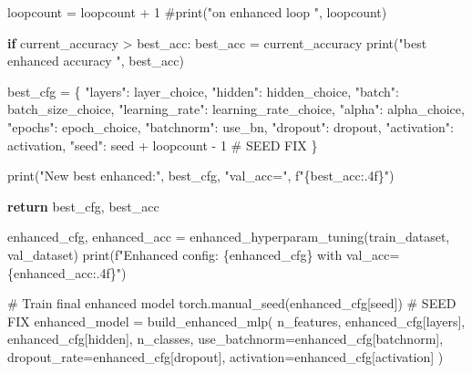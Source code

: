 \documentclass[
  letterpaper,
  DIV=11,
  numbers=noendperiod]{scrartcl}
\newenvironment{Shaded}{\begin{snugshade}}{\end{snugshade}}
\newcommand{\BuiltInTok}[1]{\textcolor[rgb]{0.00,0.23,0.31}{#1}}
\newcommand{\CommentTok}[1]{\textcolor[rgb]{0.37,0.37,0.37}{#1}}
\newcommand{\ControlFlowTok}[1]{\textcolor[rgb]{0.00,0.23,0.31}{\textbf{#1}}}
\newcommand{\DecValTok}[1]{\textcolor[rgb]{0.68,0.00,0.00}{#1}}
\newcommand{\NormalTok}[1]{\textcolor[rgb]{0.00,0.23,0.31}{#1}}
\newcommand{\OperatorTok}[1]{\textcolor[rgb]{0.37,0.37,0.37}{#1}}
\newcommand{\SpecialCharTok}[1]{\textcolor[rgb]{0.37,0.37,0.37}{#1}}
\newcommand{\SpecialStringTok}[1]{\textcolor[rgb]{0.13,0.47,0.30}{#1}}
\newcommand{\StringTok}[1]{\textcolor[rgb]{0.13,0.47,0.30}{#1}}
\begin{document}
\begin{Shaded}
\begin{Highlighting}[]
\NormalTok{        loopcount }\OperatorTok{=}\NormalTok{ loopcount }\OperatorTok{+} \DecValTok{1}
        \CommentTok{\#print("on enhanced loop ", loopcount)}

        \ControlFlowTok{if}\NormalTok{ current\_accuracy }\OperatorTok{\textgreater{}}\NormalTok{ best\_acc:}
\NormalTok{            best\_acc }\OperatorTok{=}\NormalTok{ current\_accuracy}
            \BuiltInTok{print}\NormalTok{(}\StringTok{"best enhanced accuracy "}\NormalTok{, best\_acc)}

\NormalTok{            best\_cfg }\OperatorTok{=}\NormalTok{ \{}
                \StringTok{"layers"}\NormalTok{: layer\_choice,}
                \StringTok{"hidden"}\NormalTok{: hidden\_choice,}
                \StringTok{"batch"}\NormalTok{: batch\_size\_choice,}
                \StringTok{"learning\_rate"}\NormalTok{: learning\_rate\_choice,}
                \StringTok{"alpha"}\NormalTok{: alpha\_choice,}
                \StringTok{"epochs"}\NormalTok{: epoch\_choice,}
                \StringTok{"batchnorm"}\NormalTok{: use\_bn,}
                \StringTok{"dropout"}\NormalTok{: dropout,}
                \StringTok{"activation"}\NormalTok{: activation,}
                \StringTok{"seed"}\NormalTok{: seed }\OperatorTok{+}\NormalTok{ loopcount }\OperatorTok{{-}} \DecValTok{1}  \CommentTok{\# SEED FIX}
\NormalTok{            \}}

            \BuiltInTok{print}\NormalTok{(}\StringTok{"New best enhanced:"}\NormalTok{, best\_cfg, }\StringTok{"val\_acc="}\NormalTok{, }\SpecialStringTok{f"}\SpecialCharTok{\{}\NormalTok{best\_acc}\SpecialCharTok{:.4f\}}\SpecialStringTok{"}\NormalTok{)}

    \ControlFlowTok{return}\NormalTok{ best\_cfg, best\_acc}


\NormalTok{enhanced\_cfg, enhanced\_acc }\OperatorTok{=}\NormalTok{ enhanced\_hyperparam\_tuning(train\_dataset, val\_dataset)}
\BuiltInTok{print}\NormalTok{(}\SpecialStringTok{f"Enhanced config: }\SpecialCharTok{\{}\NormalTok{enhanced\_cfg}\SpecialCharTok{\}}\SpecialStringTok{ with val\_acc=}\SpecialCharTok{\{}\NormalTok{enhanced\_acc}\SpecialCharTok{:.4f\}}\SpecialStringTok{"}\NormalTok{)}

\CommentTok{\# Train final enhanced model}
\NormalTok{torch.manual\_seed(enhanced\_cfg[}\StringTok{\textquotesingle{}seed\textquotesingle{}}\NormalTok{]) }\CommentTok{\# SEED FIX}
\NormalTok{enhanced\_model }\OperatorTok{=}\NormalTok{ build\_enhanced\_mlp(}
\NormalTok{    n\_features,}
\NormalTok{    enhanced\_cfg[}\StringTok{\textquotesingle{}layers\textquotesingle{}}\NormalTok{],}
\NormalTok{    enhanced\_cfg[}\StringTok{\textquotesingle{}hidden\textquotesingle{}}\NormalTok{],}
\NormalTok{    n\_classes,}
\NormalTok{    use\_batchnorm}\OperatorTok{=}\NormalTok{enhanced\_cfg[}\StringTok{\textquotesingle{}batchnorm\textquotesingle{}}\NormalTok{],}
\NormalTok{    dropout\_rate}\OperatorTok{=}\NormalTok{enhanced\_cfg[}\StringTok{\textquotesingle{}dropout\textquotesingle{}}\NormalTok{],}
\NormalTok{    activation}\OperatorTok{=}\NormalTok{enhanced\_cfg[}\StringTok{\textquotesingle{}activation\textquotesingle{}}\NormalTok{]}
\NormalTok{)}


\end{Highlighting}
\end{Shaded}
\end{document}
